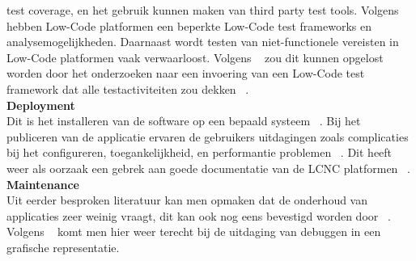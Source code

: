 test coverage, en het gebruik kunnen maken van third party test tools. 
Volgens ~\textcite{Rokis_2022} hebben Low-Code platformen een beperkte Low-Code test frameworks en analysemogelijkheden. 
Daarnaast wordt testen van niet-functionele vereisten in Low-Code platformen vaak verwaarloost. 
Volgens ~\textcite{Rokis_2022} zou dit kunnen opgelost worden door het onderzoeken naar een invoering van een Low-Code test framework dat alle testactiviteiten zou dekken ~\autocite{Rokis_2022}.
\\
\textbf{Deployment}
\\
Dit is het installeren van de software op een bepaald systeem ~\autocite{Ghumatkar_2023}.
Bij het publiceren van de applicatie ervaren de gebruikers uitdagingen zoals complicaties bij het configureren, toegankelijkheid, en performantie problemen ~\autocite{Rokis_2022}. 
Dit heeft weer als oorzaak een gebrek aan goede documentatie van de LCNC platformen ~\autocite{Rokis_2022}.
\\
\textbf{Maintenance}
\\
Uit eerder besproken literatuur kan men opmaken dat de onderhoud van applicaties zeer weinig vraagt, dit kan ook nog eens bevestigd worden door ~\textcite{Rokis_2022}.
Volgens ~\textcite{Rokis_2022} komt men hier weer terecht bij de uitdaging van debuggen in een grafische representatie.


